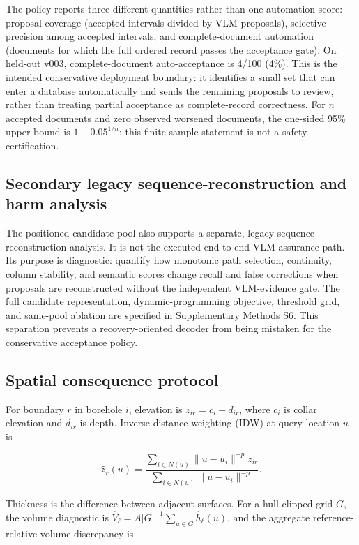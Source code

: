 \documentclass[a4paper,fleqn]{cas-sc}
\begin{document}
The policy reports three different quantities rather than one automation score: proposal coverage (accepted intervals divided by VLM proposals), selective precision among accepted intervals, and complete-document automation (documents for which the full ordered record passes the acceptance gate). On held-out v003, complete-document auto-acceptance is 4/100 (4\%). This is the intended conservative deployment boundary: it identifies a small set that can enter a database automatically and sends the remaining proposals to review, rather than treating partial acceptance as complete-record correctness. For \(n\) accepted documents and zero observed worsened documents, the one-sided 95\% upper bound is \(1 - 0.05^{1/n}\); this finite-sample statement is not a safety certification.

\subsection{Secondary legacy sequence-reconstruction and harm analysis}

The positioned candidate pool also supports a separate, legacy sequence-reconstruction analysis. It is not the executed end-to-end VLM assurance path. Its purpose is diagnostic: quantify how monotonic path selection, continuity, column stability, and semantic scores change recall and false corrections when proposals are reconstructed without the independent VLM-evidence gate. The full candidate representation, dynamic-programming objective, threshold grid, and same-pool ablation are specified in Supplementary Methods S6. This separation prevents a recovery-oriented decoder from being mistaken for the conservative acceptance policy.

\subsection{Spatial consequence protocol}

For boundary \(r\) in borehole \(i\), elevation is \(z_{ir}=c_i-d_{ir}\), where \(c_i\) is collar elevation and \(d_{ir}\) is depth. Inverse-distance weighting (IDW) at query location \(u\) is

\[
\hat z_r(u)=\frac{\sum_{i\in N(u)}\lVert u-u_i\rVert^{-p}z_{ir}}{\sum_{i\in N(u)}\lVert u-u_i\rVert^{-p}}.
\]

Thickness is the difference between adjacent surfaces. For a hull-clipped grid \(G\), the volume diagnostic is \(\hat V_\ell=A|G|^{-1}\sum_{u\in G}\hat h_\ell(u)\), and the aggregate reference-relative volume discrepancy is
\end{document}
